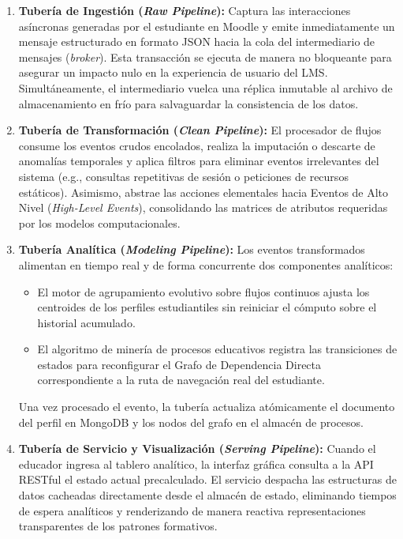 \begin{enumerate}
    \item \textbf{Tubería de Ingestión (\textit{Raw Pipeline}):} Captura las interacciones asíncronas generadas por el estudiante en Moodle y emite inmediatamente un mensaje estructurado en formato JSON hacia la cola del intermediario de mensajes (\textit{broker}). Esta transacción se ejecuta de manera no bloqueante para asegurar un impacto nulo en la experiencia de usuario del LMS. Simultáneamente, el intermediario vuelca una réplica inmutable al archivo de almacenamiento en frío para salvaguardar la consistencia de los datos.
    
    \item \textbf{Tubería de Transformación (\textit{Clean Pipeline}):} El procesador de flujos consume los eventos crudos encolados, realiza la imputación o descarte de anomalías temporales y aplica filtros para eliminar eventos irrelevantes del sistema (e.g., consultas repetitivas de sesión o peticiones de recursos estáticos). Asimismo, abstrae las acciones elementales hacia Eventos de Alto Nivel (\textit{High-Level Events}), consolidando las matrices de atributos requeridas por los modelos computacionales.
    
    \item \textbf{Tubería Analítica (\textit{Modeling Pipeline}):} Los eventos transformados alimentan en tiempo real y de forma concurrente dos componentes analíticos:
    \begin{itemize}
        \item El motor de agrupamiento evolutivo sobre flujos continuos ajusta los centroides de los perfiles estudiantiles sin reiniciar el cómputo sobre el historial acumulado.
        \item El algoritmo de minería de procesos educativos registra las transiciones de estados para reconfigurar el Grafo de Dependencia Directa correspondiente a la ruta de navegación real del estudiante.
    \end{itemize}
    Una vez procesado el evento, la tubería actualiza atómicamente el documento del perfil en MongoDB y los nodos del grafo en el almacén de procesos.
    
    \item \textbf{Tubería de Servicio y Visualización (\textit{Serving Pipeline}):} Cuando el educador ingresa al tablero analítico, la interfaz gráfica consulta a la API RESTful el estado actual precalculado. El servicio despacha las estructuras de datos cacheadas directamente desde el almacén de estado, eliminando tiempos de espera analíticos y renderizando de manera reactiva representaciones transparentes de los patrones formativos.
\end{enumerate}